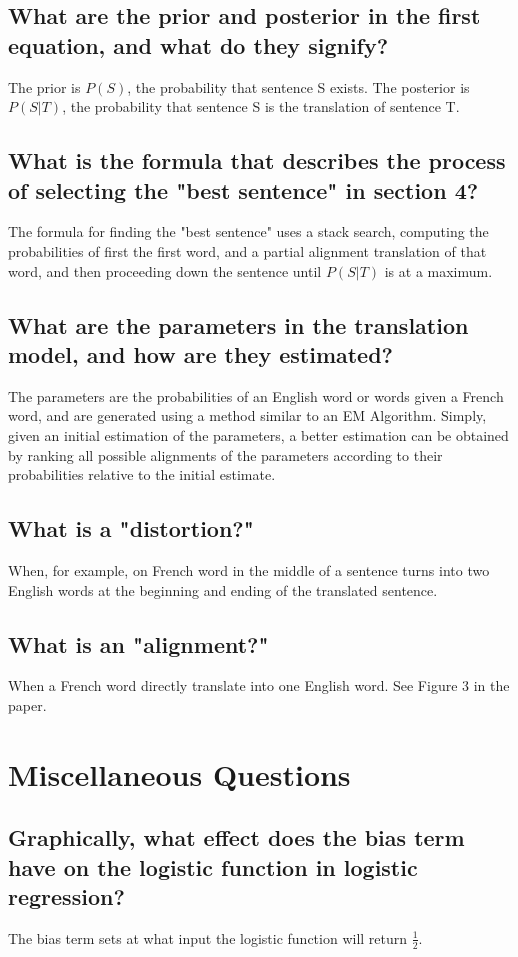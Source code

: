 \documentclass{article}
\begin{document}
\subsection{What are the prior and posterior in the first equation, and what do they signify?}
The prior is $P(S)$, the probability that sentence S exists. The posterior is $P(S|T)$, the probability that sentence S is the translation of sentence T.

\subsection{What is the formula that describes the process of selecting the "best sentence" in section 4?}
The formula for finding the "best sentence" uses a stack search, computing the probabilities of first the first word, and a partial alignment translation of that word, and then proceeding down the sentence until $P(S|T)$ is at a maximum.  

\subsection{What are the parameters in the translation model, and how are they estimated?}
The parameters are the probabilities of an English word or words given a French word, and are generated using a method similar to an EM Algorithm. Simply, given an initial estimation of the parameters, a better estimation can be obtained by ranking all possible alignments of the parameters according to their probabilities relative to the initial estimate. 

\subsection{What is a "distortion?"}
When, for example, on French word in the middle of a sentence turns into two English words at the beginning and ending of the translated sentence. 

\subsection{What is an "alignment?"}
When a French word directly translate into one English word. See Figure 3 in the paper.

\section{Miscellaneous Questions}
\subsection{Graphically, what effect does the bias term have on the logistic function in logistic regression?}
The bias term sets at what input the logistic function will return $\frac{1}{2}$.
\end{document}
